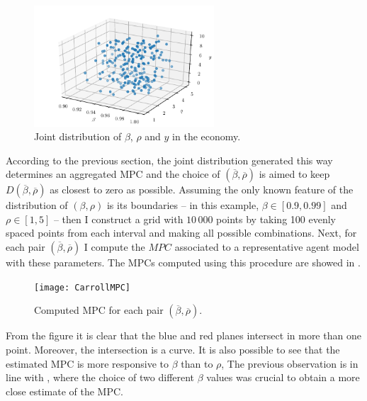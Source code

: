 \documentclass[english, a4paper, 12pt]{article}
\begin{document}
	
	\begin{figure}[H]
		\caption{Joint distribution of $\beta$, $\rho$ and $y$ in the economy.}
		\label{fig:JointDistrib}
		\includegraphics[width=0.6\textwidth]{CarrollDistrib3d}
	\end{figure}

According to the previous section, the joint distribution generated this way determines an aggregated MPC and the choice of $(\overline{\beta}, \overline{\rho})$ is aimed to keep $D(\overline{\beta}, \overline{\rho})$ as closest to zero as possible. Assuming the only known feature of the distribution of $(\beta, \rho)$ is its boundaries -- in this example, $\beta \in [0.9, 0.99]$ and $\rho \in [1,5]$ -- then I construct a grid with $10\,000$ points by taking 100 evenly spaced points from each interval and making all possible combinations. Next, for each pair $(\overline{\beta}, \overline{\rho})$ I compute the $MPC$ associated to a representative agent model with these parameters. The MPCs computed using this procedure are showed in . 
	\begin{figure}[H]
		\caption{Computed MPC for each pair $(\overline{\beta}, \overline{\rho})$.}
		\label{fig:MPCPlane}
		\texttt{[image: CarrollMPC]}
	\end{figure}

\newpage
From the figure it is clear that the blue and red planes intersect in more than one point. Moreover, the intersection is a curve. It is also possible to see that the estimated MPC is more responsive to $\beta$ than to $\rho$,  The previous observation is in line with \cite{CarrollRequiem}, where the choice of two different $\beta$ values was crucial to obtain a more close estimate of the MPC. 
\end{document}
